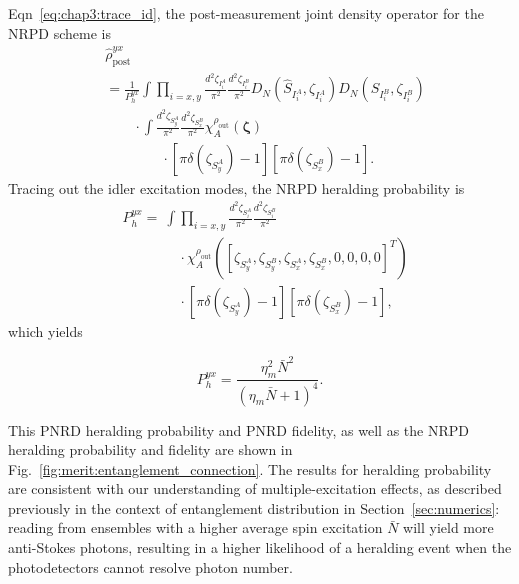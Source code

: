 \documentclass[aps,twocolumn,secnumarabic,amsmath,amssymb,pra,groupedaddress,
showpacs, showkeys,draft]{revtex4-1}
\newcommand{\pna}[1]{\left(#1\right)}
\newcommand{\pnb}[1]{\left[#1\right]}
\newcommand{\eqn}[1]{
\begin{equation}
	#1
\end{equation}
}
\begin{document}
Eqn~\ref{eq:chap3:trace_id}, the post-measurement joint density operator for
the NRPD scheme is
\begin{align}
& \hat{\rho}_{\textrm{post}}^{yx} \nonumber \\
& = \frac{1}{P_{h}^{yx}}\int \prod_{i=x,y}
\frac{d^2 \zeta_{I_i^A}}{\pi^2} 
\frac{d^2 \zeta_{I_i^B}}{\pi^2} 
D_N\pna{\hat{S}_{I_i^A},\zeta_{I_i^A}} 
D_N\pna{\hat{S}_{I_i^B},\zeta_{I_i^B}}  \nonumber \\
& \qquad \cdot \int 
\frac{d^2 \zeta_{S_y^A}}{\pi^2} 
\frac{d^2 \zeta_{S_x^B}}{\pi^2}
\chi_A^{\rho_{\textrm{out}}}\pna{\bm{\zeta}} \nonumber \\
& \qquad \qquad \cdot \pnb{\pi\delta\pna{\zeta_{S_y^A}}-1}\pnb{\pi\delta\pna{\zeta_{S_x^B}}-1}.
\end{align}
Tracing out the idler excitation modes, the NRPD heralding probability is 
\begin{align}
& P_{h}^{yx} = \nonumber \ \int 
\prod_{i=x,y}
\frac{d^2 \zeta_{S_i^A}}{\pi^2} 
\frac{d^2 \zeta_{S_i^B}}{\pi^2} \nonumber \\ 
& \qquad \qquad \cdot
\chi_A^{\rho_{\textrm{out}}}\pna{\pnb{\zeta_{S_y^A},\zeta_{S_y^B},\zeta_{S_x^A},\zeta_{S_x^B},0,0,0,0}^T}
\nonumber \\
& \qquad \qquad \cdot 
\pnb{\pi\delta\pna{\zeta_{S_y^A}}-1}\pnb{\pi\delta\pna{\zeta_{S_x^B}}-1},
\end{align}
which yields
\eqn{
P_{h}^{yx} = \frac{\eta ^2_{m} \bar{N}^2}{(\eta_{m}  \bar{N}+1)^4}.
}
This PNRD heralding probability and PNRD fidelity, as well as the NRPD
heralding probability and fidelity are shown in
Fig.~\ref{fig:merit:entanglement_connection}. The results for heralding
probability are consistent with our understanding of multiple-excitation
effects, as described previously in the context of entanglement distribution in
Section~\ref{sec:numerics}: reading from ensembles with a higher average spin
excitation $\bar{N}$ will yield more anti-Stokes photons, resulting in a higher
likelihood of a heralding event when the photodetectors cannot resolve photon
number.
\end{document}
